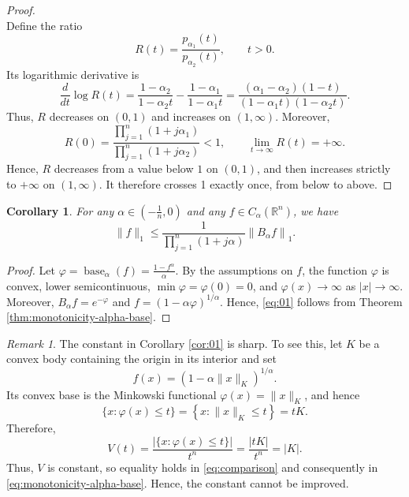 \documentclass[11pt]{amsart}
\theoremstyle{plain}
\newtheorem{corollary}[theorem]{Corollary}
\theoremstyle{definition}
\theoremstyle{remark}
\newtheorem{remark}{Remark}
\begin{document}
\begin{proof}
\[    \]
    Define the ratio
    \[
        R (t) = \frac{p_{\alpha_1} (t)}{p_{\alpha_2}(t)}, \qquad t>0.
    \]
    Its logarithmic derivative is
    $$
    \frac{d}{d t} \log R(t)=\frac{1-\alpha_2}{1-\alpha_2 t}-\frac{1-\alpha_1}{1-\alpha_1 t}=\frac{\left(\alpha_1-\alpha_2\right)(1-t)}{\left(1-\alpha_1 t\right)\left(1-\alpha_2 t\right)}.
    $$
    Thus, $R$ decreases on $( 0,1 )$ and increases on $( 1, \infty )$. Moreover,
    $$
        R(0) = \frac{\prod_{j=1}^n(1+j \alpha_1)}{\prod_{j=1}^n(1+j \alpha_2)} < 1, \qquad  \lim_{t \rightarrow \infty} R(t) = + \infty.
    $$
    Hence, $R$ decreases from a value below $1$ on $( 0,1 )$, and then increases strictly to $+\infty$ on $(1, \infty)$. It therefore crosses 1 exactly once, from below to above.
\end{proof}

\begin{corollary}
For any $\alpha\in(-\frac{1}{n},0)$ and any $f\in C_\alpha(\mathbb R^n)$, we have
\begin{equation}\label{eq:01}
    \|f\|_1 \leq \frac{1}{\prod_{j=1}^n(1+j \alpha)}\left\|B_\alpha f\right\|_1.
\end{equation}
\end{corollary}
\begin{proof}
    Let $\varphi = \operatorname{base}_\alpha(f) = \frac{1 - f^\alpha}{\alpha}$. By the assumptions on $f$, the function $\varphi$ is convex, lower semicontinuous, $\min \varphi=\varphi(0)=0$, and $\varphi(x) \rightarrow \infty$ as $|x| \rightarrow \infty$.
    Moreover, $B_\alpha f = e^{-\varphi}$ and $f = (1-\alpha  \varphi)^{1/\alpha}$. Hence, \eqref{eq:01} follows from Theorem \ref{thm:monotonicity-alpha-base}.
\end{proof}

\begin{remark}
    The constant in Corollary \ref{cor:01} is sharp. To see this, let $K$ be a convex body containing the origin in its interior and set
    $$
    f(x)=\left(1-\alpha\|x\|_K\right)^{1 / \alpha} .
    $$
    Its convex base is the Minkowski functional $\varphi(x)=\|x\|_K$, and hence
    $$
    \{x: \varphi(x) \leq t\}=\left\{x:\|x\|_K \leq t\right\}=t K .
    $$
    Therefore,
    $$
    V(t)=\frac{|\{x: \varphi(x) \leq t\}|}{t^n}=\frac{|t K|}{t^n}=|K|.
    $$
    Thus, $V$ is constant, so equality holds in \eqref{eq:comparison} and consequently in \eqref{eq:monotonicity-alpha-base}. Hence, the constant cannot be improved.
\end{remark}
\end{document}
